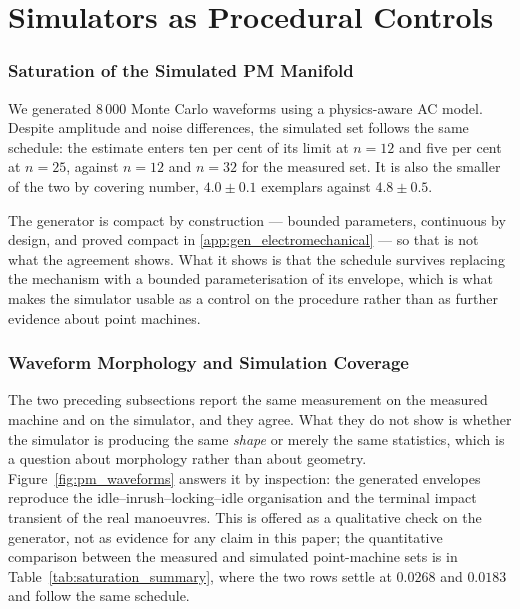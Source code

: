 \documentclass[10pt]{article}
\theoremstyle{plain}
\theoremstyle{definition}
\theoremstyle{remark}
\begin{document}
\section{Simulators as Procedural Controls}\label{app:simulators}
\subsubsection{Saturation of the Simulated PM Manifold}

We generated 8\,000 Monte Carlo waveforms using a physics-aware AC model.
Despite amplitude and noise differences, the simulated set follows the same
schedule: the estimate enters ten per cent of its limit at $n=12$ and five per
cent at $n=25$, against $n=12$ and $n=32$ for the measured set. It is also the
smaller of the two by covering number, $4.0 \pm 0.1$ exemplars against
$4.8 \pm 0.5$.

The generator is compact by construction --- bounded parameters, continuous by
design, and proved compact in \ref{app:gen_electromechanical} --- so
that is not what the agreement shows. What it shows is that the schedule
survives replacing the mechanism with a bounded parameterisation of its
envelope, which is what makes the simulator usable as a control on the
procedure rather than as further evidence about point machines.



\subsubsection{Waveform Morphology and Simulation Coverage}

The two preceding subsections report the same measurement on the measured
machine and on the simulator, and they agree. What they do not show is whether
the simulator is producing the same \emph{shape} or merely the same statistics,
which is a question about morphology rather than about geometry.
Figure~\ref{fig:pm_waveforms} answers it by inspection: the generated envelopes
reproduce the idle--inrush--locking--idle organisation and the terminal impact
transient of the real manoeuvres. This is offered as a qualitative check on the
generator, not as evidence for any claim in this paper; the quantitative
comparison between the measured and simulated point-machine sets is in
Table~\ref{tab:saturation_summary}, where the two rows settle at $0.0268$ and
$0.0183$ and follow the same schedule.
\end{document}
